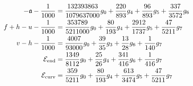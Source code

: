 \documentclass[11pt,a4paper]{article}
\numberwithin{equation}{section}
\theoremstyle{remark}
\begin{document}
\begin{align}
-\mathfrak a-\frac1{1000} &= \frac{132393863}{1079637000}g_{0}+\frac{220}{893}g_{4}+\frac{96}{893}g_{5}+\frac{337}{3572}g_{6}\label{cert:axis:10}\\
f+h-u-\frac1{1000} &= \frac{353789}{5211000}g_{0}+\frac{80}{193}g_{4}+\frac{2912}{1737}g_{5}+\frac{47}{5211}g_{7}\label{cert:axis:11}\\
v-h-\frac1{1000} &= \frac{4007}{93000}g_{0}+\frac{39}{35}g_{3}+\frac{13}{28}g_{6}+\frac{1}{140}g_{7}\label{cert:axis:12}\\
\mathcal E_{\rm end} &= \frac{1349}{8112}g_{0}+\frac{25}{26}g_{4}+\frac{341}{416}g_{6}+\frac{1}{416}g_{7}\label{cert:axis:13}\\
\mathcal E_{\rm curv} &= \frac{359}{5211}g_{0}+\frac{80}{193}g_{4}+\frac{613}{3474}g_{5}+\frac{47}{5211}g_{7}\label{cert:axis:14}
\end{align}
\endgroup
\end{document}

